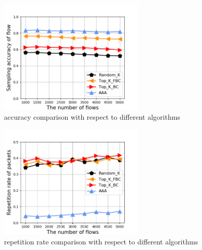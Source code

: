 \documentclass[conference]{IEEEtran}
\begin{document}
\begin{figure}[!hhhhhhhhhht]
\centering
\includegraphics[width=7cm]{images/cmp_sam_accu.png}
\caption{accuracy comparison with respect to different algorithms}
\label{aaa.png}
\end{figure}
\begin{figure}[!hhhhhhhhhht]
\centering
\includegraphics[width=7cm]{images/cmp_rep_rate.png}
\caption{repetition rate comparison with respect to different algorithms}
\label{aaa.png}
\end{figure}


\end{document}
